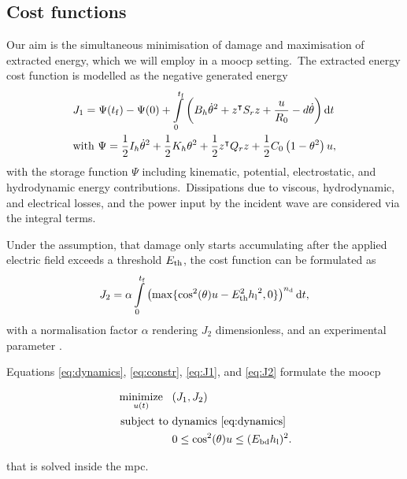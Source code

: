 \subsection{Cost functions}
Our aim is the simultaneous minimisation of damage and maximisation of extracted energy, which we will employ in a \ac{moocp} setting.\ 
The extracted energy cost function is modelled as the negative generated energy
\begin{equation}\label{eq:J1}
	\begin{split}
		& J_1 = \Psi(\tf)-\Psi(0) +\int_0^{\tf} \left(B_h\dot{\theta}^2 +z^\intercal S_r z +\dfrac{u}{R_0} - d \dot{\theta}\right) \text{d}t \\
		& \text{with}\ \Psi = \dfrac{1}{2}I_h\dot{\theta}^2+\dfrac{1}{2}K_h{\theta}^2+ \dfrac{1}{2}z^\intercal Q_r z + \dfrac{1}{2} C_0\left(1 - \theta^2 \right) u,
	\end{split}
\end{equation}
with the storage function $\Psi$ including kinematic, potential, electrostatic, and hydrodynamic energy contributions.\ 
Dissipations due to viscous, hydrodynamic, and electrical losses, and the power input by the incident wave are considered via the integral terms.\ 
\ 


Under the assumption, that damage only starts accumulating after the applied electric field exceeds a threshold $E_\mathrm{th}$, the cost function can be formulated as
\begin{equation}\label{eq:J2}
	J_2 = \alpha \int_0^{\tf} \left(\max \{ \cos^2(\theta)u-\Eth^2 {\hl}^2,0 \} \right)^{\nd} \text{d}t, 
\end{equation}
with a normalisation factor $\alpha$ rendering $J_2$ dimensionless,  and an experimental parameter \nd.\ 
\ 

Equations \eqref{eq:dynamics}, \eqref{eq:constr}, \eqref{eq:J1}, and \eqref{eq:J2} formulate the \ac{moocp}

\begin{problem}\label{prob:ocp}
	\begin{align}\label{eq:problem}
	\operatorname*{minimize}_{u(t)} \ \ \, &(J_1, J_2) \nonumber\\
	\ \text{subject to} \ &\text{dynamics}\ \eqref{eq:dynamics} \nonumber\\
	&0 \le \cos^2(\theta) u \le (E_\mathrm{bd} h_\mathrm{l})^2.
\end{align}
\end{problem}
that is solved inside the \ac{mpc}.